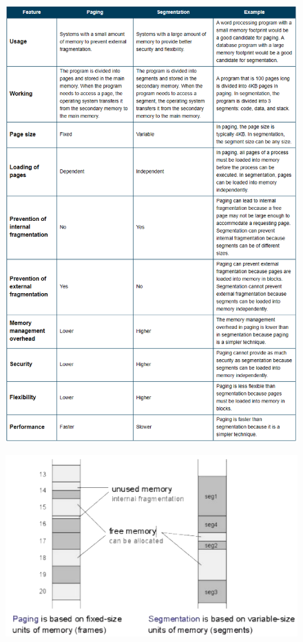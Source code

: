 \begin{figure}[h!]
    \centering
    \includegraphics[width=1\linewidth]{img/dsfb.png}
\end{figure}

\newpage
\begin{figure}[h!]
    \centering
    \includegraphics[width=0.75\linewidth]{img/Immagine 2024-05-22 170639.png}
\end{figure}

